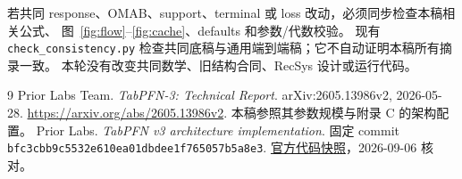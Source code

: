\documentclass[11pt,UTF8,fontset=fandol]{ctexart}
\begin{document}
若共同 response、OMAB、support、terminal 或 loss 改动，必须同步检查本稿相关公式、
图~\ref{fig:flow}--\ref{fig:cache}、defaults 和参数/代数校验。
现有 \texttt{check\_consistency.py} 检查共同底稿与通用端到端稿；它不自动证明本稿所有摘录一致。
本轮没有改变共同数学、旧结构合同、RecSys 设计或运行代码。

\begin{thebibliography}{9}
 Prior Labs Team. \emph{TabPFN-3: Technical Report}. arXiv:2605.13986v2, 2026-05-28.
\url{https://arxiv.org/abs/2605.13986v2}. 本稿参照其参数规模与附录 C 的架构配置。
 Prior Labs. \emph{TabPFN v3 architecture implementation}.
固定 commit \texttt{bfc3cbb9c5532e610ea01dbdee1f765057b5a8e3}.
\href{https://github.com/PriorLabs/TabPFN/blob/bfc3cbb9c5532e610ea01dbdee1f765057b5a8e3/src/tabpfn/architectures/tabpfn_v3.py}{官方代码快照}，2026-09-06 核对。
\end{thebibliography}
\end{document}
